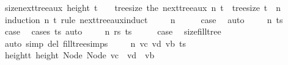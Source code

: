 \begin{isabellebody}
\endisatagproof
{\isafoldproof}%
%
\isadelimproof
\isanewline
%
\endisadelimproof
\isanewline
{}\isamarkupfalse%
\ size{\isacharunderscore}{\kern0pt}next{\isacharunderscore}{\kern0pt}tree{\isacharunderscore}{\kern0pt}aux{\isacharcolon}{\kern0pt}\ {\isachardoublequoteopen}height\ t\ {\isasymge}\ {}\ {\isasymLongrightarrow}\ tree{\isacharunderscore}{\kern0pt}size\ {\isacharparenleft}{\kern0pt}the\ {\isacharparenleft}{\kern0pt}next{\isacharunderscore}{\kern0pt}tree{\isacharunderscore}{\kern0pt}aux\ n\ t{\isacharparenright}{\kern0pt}{\isacharparenright}{\kern0pt}\ {\isacharequal}{\kern0pt}\ tree{\isacharunderscore}{\kern0pt}size\ t\ {\isacharplus}{\kern0pt}\ n{\isachardoublequoteclose}\isanewline
%
\isadelimproof
%
\endisadelimproof
%
\isatagproof
{}\isamarkupfalse%
\ {\isacharparenleft}{\kern0pt}induction\ n\ t\ rule{\isacharcolon}{\kern0pt}\ next{\isacharunderscore}{\kern0pt}tree{\isacharunderscore}{\kern0pt}aux{\isachardot}{\kern0pt}induct{\isacharparenright}{\kern0pt}\isanewline
\ \ \isamarkupfalse%
\ {\isacharparenleft}{\kern0pt}{}\ n{\isacharparenright}{\kern0pt}\isanewline
\ \ \isamarkupfalse%
\ \isamarkupfalse%
\ {\isacharquery}{\kern0pt}case\ \isamarkupfalse%
\ auto\isanewline
{}\isamarkupfalse%
\isanewline
\ \ \isamarkupfalse%
\ {\isacharparenleft}{\kern0pt}{}\ n\ ts{\isacharparenright}{\kern0pt}\isanewline
\ \ \isamarkupfalse%
\ \isamarkupfalse%
\ {\isacharquery}{\kern0pt}case\ \isamarkupfalse%
\ {\isacharparenleft}{\kern0pt}cases\ ts{\isacharparenright}{\kern0pt}\ auto\isanewline
{}\isamarkupfalse%
\isanewline
\ \ \isamarkupfalse%
\ {\isacharparenleft}{\kern0pt}{}\ n\ rs\ ts{\isacharparenright}{\kern0pt}\isanewline
\ \ \isamarkupfalse%
\ \isamarkupfalse%
\ {\isacharquery}{\kern0pt}case\ \isamarkupfalse%
\ size{\isacharunderscore}{\kern0pt}fill{\isacharunderscore}{\kern0pt}tree\ \isamarkupfalse%
\ {\isacharparenleft}{\kern0pt}auto\ simp\ del{\isacharcolon}{\kern0pt}\ fill{\isacharunderscore}{\kern0pt}tree{\isachardot}{\kern0pt}simps{\isacharparenright}{\kern0pt}\isanewline
{}\isamarkupfalse%
\isanewline
\ \ \isamarkupfalse%
\ {\isacharparenleft}{\kern0pt}{}\ n\ vc\ vd\ vb\ ts{\isacharparenright}{\kern0pt}\isanewline
\ \ \isamarkupfalse%
\ height{\isacharunderscore}{\kern0pt}t{\isacharcolon}{\kern0pt}\ {\isachardoublequoteopen}height\ {\isacharparenleft}{\kern0pt}Node\ {\isacharparenleft}{\kern0pt}Node\ {\isacharparenleft}{\kern0pt}vc\ {\isacharhash}{\kern0pt}\ vd{\isacharparenright}{\kern0pt}\ {\isacharhash}{\kern0pt}\ vb{\isacharparenright}{\kern0pt}{\isacharparenright}{\kern0pt}\ {\isasymge}\ {}{\isachardoublequoteclose}\ \isamarkupfalse%

\end{isabellebody}
